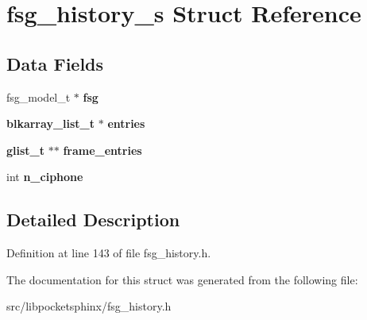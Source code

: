 \section{fsg\-\_\-history\-\_\-s \-Struct \-Reference}
\label{structfsg__history__s}
\subsection*{\-Data \-Fields}
\begin{DoxyCompactItemize}
\item 
fsg\-\_\-model\-\_\-t $\ast$ {\bfseries fsg}\label{structfsg__history__s_a94e0017e3a659d1dbd6be4909d7f0d3a}

\item 
{\bf blkarray\-\_\-list\-\_\-t} $\ast$ {\bfseries entries}\label{structfsg__history__s_a4f67554340da492c054cccf64adb44ca}

\item 
{\bf glist\-\_\-t} $\ast$$\ast$ {\bfseries frame\-\_\-entries}\label{structfsg__history__s_a45d7ce088233dd4f262d641b7dc7a6b1}

\item 
int {\bfseries n\-\_\-ciphone}\label{structfsg__history__s_a23223dcf3542fb87e1c176223aaa4f7d}

\end{DoxyCompactItemize}


\subsection{\-Detailed \-Description}


\-Definition at line 143 of file fsg\-\_\-history.\-h.



\-The documentation for this struct was generated from the following file\-:\begin{DoxyCompactItemize}
\item 
src/libpocketsphinx/fsg\-\_\-history.\-h\end{DoxyCompactItemize}
